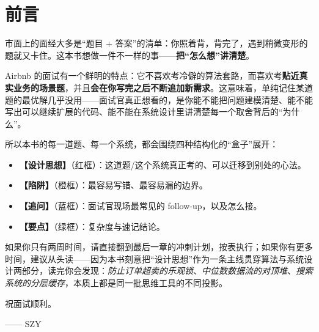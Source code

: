 \chapter*{前言}

市面上的面经大多是“题目 + 答案”的清单：你照着背，背完了，遇到稍微变形的题就又卡住。这本书想做一件不一样的事——\textbf{把“怎么想”讲清楚}。

Airbnb 的面试有一个鲜明的特点：它不喜欢考冷僻的算法套路，而喜欢考\textbf{贴近真实业务的场景题}，并且\textbf{会在你写完之后不断追加新需求}。这意味着，单纯记住某道题的最优解几乎没用——面试官真正想看的，是你能不能把问题建模清楚、能不能写出可以继续扩展的代码、能不能在系统设计里讲清楚每一个取舍背后的“为什么”。

所以本书的每一道题、每一个系统，都会围绕四种结构化的“盒子”展开：

\begin{itemize}
  \item \textbf{【设计思想】}（红框）：这道题/这个系统真正考的、可以迁移到别处的心法。
  \item \textbf{【陷阱】}（橙框）：最容易写错、最容易漏的边界。
  \item \textbf{【追问】}（蓝框）：面试官现场最常见的 follow-up，以及怎么接。
  \item \textbf{【要点】}（绿框）：复杂度与速记结论。
\end{itemize}

如果你只有两周时间，请直接翻到最后一章的冲刺计划，按表执行；如果你有更多时间，建议从头读——因为本书刻意把“设计思想”作为一条主线贯穿算法与系统设计两部分，读完你会发现：\emph{防止订单超卖的乐观锁}、\emph{中位数数据流的对顶堆}、\emph{搜索系统的分层缓存}，本质上都是同一批思维工具的不同投影。

祝面试顺利。

\vspace{1em}
\noindent\hfill —— SZY
